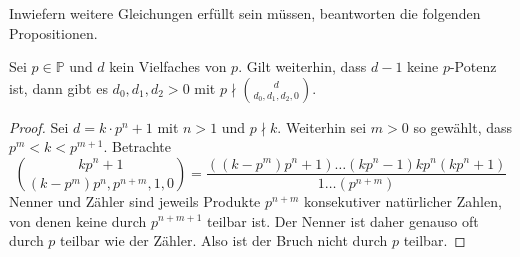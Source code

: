Inwiefern weitere Gleichungen erfüllt sein müssen, beantworten die folgenden Propositionen.
\begin{prop}
Sei $p \in \mathbb P$ und $d$ kein Vielfaches von $p$. Gilt weiterhin, dass $d-1$ keine $p$-Potenz ist, dann gibt es $d_0, d_1, d_2 > 0$ mit $p \nmid \binom d{d_0,d_1,d_2,0}$.
\end{prop}
\begin{proof}
Sei $d = k \cdot p^n + 1$ mit $n>1$ und $p \nmid k$. Weiterhin sei $m>0$ so gewählt, dass $p^m < k < p^{m+1}$. Betrachte
\begin{equation*}
\binom {kp^n+1}{(k-p^m)p^n,p^{n+m},1,0} = \frac{((k-p^m)p^n+1) \dots (kp^n-1)kp^n(kp^n+1)}{1 \dots (p^{n+m})}
\end{equation*}
Nenner und Zähler sind jeweils Produkte $p^{n+m}$ konsekutiver natürlicher Zahlen, von denen keine durch $p^{n+m+1}$ teilbar ist. Der Nenner ist daher genauso oft durch $p$ teilbar wie der Zähler. Also ist der Bruch nicht durch $p$ teilbar.
\end{proof}

